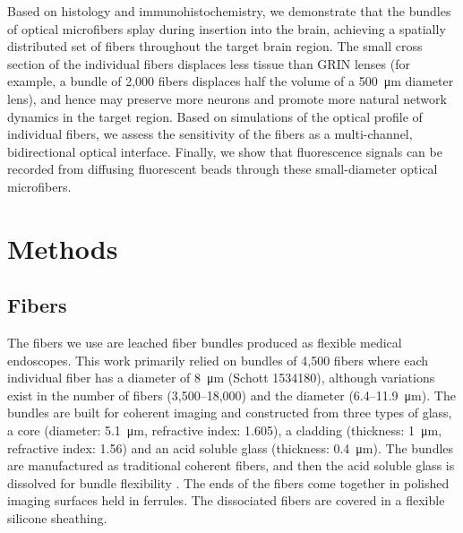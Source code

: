 Based on histology and immunohistochemistry, we demonstrate that the 
bundles of optical microfibers splay during insertion into the brain, 
achieving a spatially distributed set of fibers throughout the target 
brain region. The small cross section of the individual fibers displaces 
less tissue than GRIN lenses (for example, a bundle of 2,000 fibers 
displaces half the volume of a 500~\si{\micro\meter} diameter lens), 
and hence may preserve more neurons and promote more natural network 
dynamics in the target region. Based on simulations 
of the optical profile of individual fibers, we assess the sensitivity of 
the fibers as a multi-channel, bidirectional optical interface. Finally, 
we show that fluorescence signals can be recorded from diffusing 
fluorescent beads through these small-diameter optical microfibers.

\section{Methods}
\label{sec:methods}

\subsection{Fibers}
\label{sec:methods-fibers}

The fibers we use are leached fiber bundles produced as flexible medical 
endoscopes. This work primarily relied on bundles of 4,500 fibers where 
each individual fiber has a diameter of 8~\si{\micro\meter} (Schott 1534180), although 
variations exist in the number of fibers (3,500--18,000) and the diameter 
(6.4--11.9~\si{\micro\meter}). The bundles are built for coherent imaging and constructed 
from three types of glass, a core (diameter: 5.1~\si{\micro\meter}, refractive index: 
1.605), a cladding (thickness: 1~\si{\micro\meter}, refractive index: 1.56) and an 
acid soluble glass (thickness: 0.4~\si{\micro\meter}). The bundles are manufactured 
as traditional coherent 
fibers, and then the acid soluble glass is dissolved for bundle 
flexibility \cite{Gerstner:2004to}. The ends of the fibers come together 
in polished imaging surfaces held in ferrules. The dissociated fibers are covered 
in a flexible silicone sheathing.

